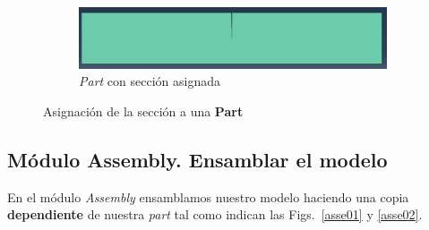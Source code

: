 \begin{figure}[!h]
    \begin{subfigure}[!h]{0.75\textwidth}
      \includegraphics[width=\textwidth]{./body/images/prop07.png}
      \caption{\textit{Part} con sección asignada}
      \label{prop07}
    \end{subfigure}%
    \caption{Asignación de la sección a una \textbf{Part}}
  \end{figure}

  \subsection{Módulo Assembly. Ensamblar el modelo}

  En el módulo \textit{Assembly} ensamblamos nuestro modelo haciendo
  una copia \textbf{dependiente} de nuestra \textit{part} tal como
  indican las Figs.~\ref{asse01} y \ref{asse02}.

